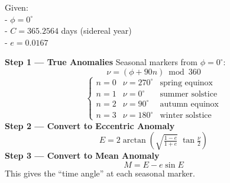 \documentclass[
  letterpaper,
]{book}
\begin{document}
Given:\\
- \(\phi = 0^\circ\)\\
- \(C = 365.2564\) days (sidereal year)\\
- \(e = 0.0167\)

\textbf{Step 1 --- True Anomalies} Seasonal markers from
\(\phi = 0^\circ\):\\
\[
\nu = (\phi + 90n) \bmod 360
\] \[
\begin{cases}
n = 0 & \nu = 270^\circ & \text{spring equinox} \\
n = 1 & \nu = 0^\circ & \text{summer solstice} \\
n = 2 & \nu = 90^\circ & \text{autumn equinox} \\
n = 3 & \nu = 180^\circ & \text{winter solstice}
\end{cases}
\] \textbf{Step 2 --- Convert to Eccentric Anomaly} \[
E = 2 \arctan \!\left( \sqrt{\tfrac{1-e}{1+e}} \;\tan \tfrac{\nu}{2} \right)
\] \textbf{Step 3 --- Convert to Mean Anomaly} \[
M = E - e \sin E
\] This gives the ``time angle'' at each seasonal marker.
\end{document}
